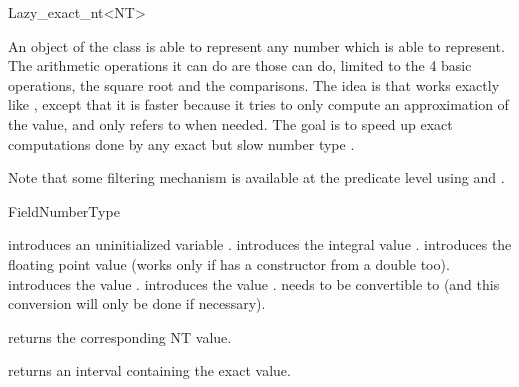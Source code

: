 
\begin{ccRefClass} {Lazy_exact_nt<NT>}
\label{lazy_exact_nt}

\ccDefinition
An object of the class  is able to represent any number
which  is able to represent.  The arithmetic operations it can do are
those  can do, limited to the 4 basic operations, the square root and
the comparisons.
The idea is that  works exactly like , except
that it is faster because it tries to only compute an approximation of the
value, and only refers to  when needed.  The goal is to speed up exact
computations done by any exact but slow number type .

Note that some filtering mechanism is available at the predicate level
using  and .


\ccIsModel
FieldNumberType

\ccTypes

\ccGlue
{}


\ccCreation
{}

{introduces an uninitialized variable \ccVar.}
\ccGlue
{}
{introduces the integral value .}
\ccGlue
{}
{introduces the floating point value  (works only if  has a
constructor from a double too).}
\ccGlue
{}
{introduces the value .}
\ccGlue
{}
{introduces the value .  needs to be convertible to 
(and this conversion will only be done if necessary).}

\ccOperations

 {returns the corresponding NT value.}

 {returns an interval containing the
exact value.}


\end{ccRefClass}
